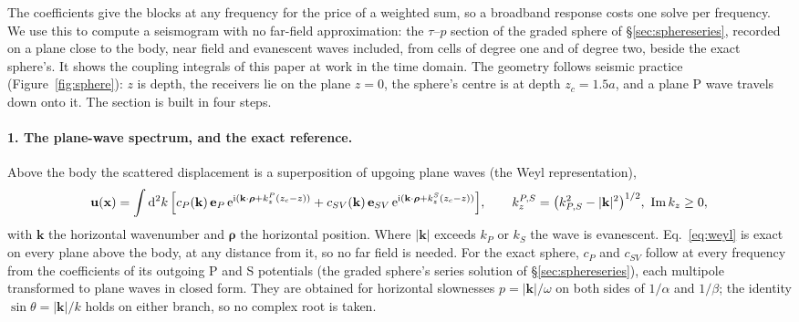 \documentclass[11pt,a4paper]{article}
\newcommand{\bu}{\mathbf{u}}
\newcommand{\dd}{\mathrm{d}}
\begin{document}
The coefficients give the blocks at any frequency for the price of a weighted sum, so a broadband response
costs one solve per frequency. We use this to compute a seismogram with no far-field approximation: the
$\tau$--$p$ section of the graded sphere of \S\ref{sec:sphereseries}, recorded on a plane close to the body,
near field and evanescent waves included, from cells of degree one and of degree two, beside the exact
sphere's. It shows the coupling integrals of this paper at work in the time domain. The geometry follows
seismic practice (Figure~\ref{fig:sphere}): $z$ is depth, the receivers lie on the plane $z=0$, the sphere's
centre is at depth $z_c=1.5a$, and a plane P wave travels down onto it. The section is built in four steps.

\paragraph{1. The plane-wave spectrum, and the exact reference.} Above the body the scattered displacement is a
superposition of upgoing plane waves (the Weyl representation),
\begin{equation}\label{eq:weyl}
  \bu(\mathbf x)=\int\dd^2k\,\Bigl[c_P(\mathbf k)\,\mathbf e_P\,\mathrm e^{\mathrm i(\mathbf k\cdot\boldsymbol\rho+k_z^P(z_c-z))}
  +c_{SV}(\mathbf k)\,\mathbf e_{SV}\,\mathrm e^{\mathrm i(\mathbf k\cdot\boldsymbol\rho+k_z^S(z_c-z))}\Bigr],\qquad
  k_z^{P,S}=\bigl(k_{P,S}^2-|\mathbf k|^2\bigr)^{1/2},\ \operatorname{Im}k_z\ge0,
\end{equation}
with $\mathbf k$ the horizontal wavenumber and $\boldsymbol\rho$ the horizontal position. Where $|\mathbf k|$
exceeds $k_P$ or $k_S$ the wave is evanescent. Eq.~\eqref{eq:weyl} is exact on every plane above the body, at
any distance from it, so no far field is needed. For the exact sphere, $c_P$ and $c_{SV}$ follow at every
frequency from the coefficients of its outgoing P and S potentials (the graded sphere's series solution of
\S\ref{sec:sphereseries}), each multipole transformed to plane waves in closed form. They are obtained for
horizontal slownesses $p=|\mathbf k|/\omega$ on both sides of $1/\alpha$ and $1/\beta$; the identity
$\sin\theta=|\mathbf k|/k$ holds on either branch, so no complex root is taken.
\end{document}
